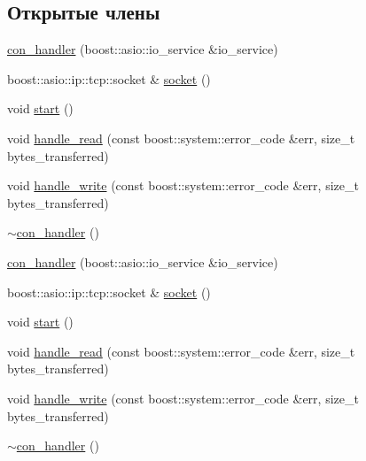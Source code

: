 \subsection*{Открытые члены}
\begin{DoxyCompactItemize}
\item 
\mbox{\hyperlink{classcon__handler_a18e7e450430ebe71687a0fd0c79507aa}{con\+\_\+handler}} (boost\+::asio\+::io\+\_\+service \&io\+\_\+service)
\item 
boost\+::asio\+::ip\+::tcp\+::socket \& \mbox{\hyperlink{classcon__handler_ad168c799678add9fb23f3379e1d42b22}{socket}} ()
\item 
void \mbox{\hyperlink{classcon__handler_a02d6691e226a75525a2ac83062b5c7f7}{start}} ()
\item 
void \mbox{\hyperlink{classcon__handler_a3b8e9edfc8fed79fcba0242a58b54bc2}{handle\+\_\+read}} (const boost\+::system\+::error\+\_\+code \&err, size\+\_\+t bytes\+\_\+transferred)
\item 
void \mbox{\hyperlink{classcon__handler_a10169d7b3588adb849d7e7c02c46375a}{handle\+\_\+write}} (const boost\+::system\+::error\+\_\+code \&err, size\+\_\+t bytes\+\_\+transferred)
\item 
\mbox{\hyperlink{classcon__handler_aa1bc82c764eb633355a52bd77689ed3f}{$\sim$con\+\_\+handler}} ()
\item 
\mbox{\hyperlink{classcon__handler_a18e7e450430ebe71687a0fd0c79507aa}{con\+\_\+handler}} (boost\+::asio\+::io\+\_\+service \&io\+\_\+service)
\item 
boost\+::asio\+::ip\+::tcp\+::socket \& \mbox{\hyperlink{classcon__handler_ad1cbd939db0c1c543425d7cd53702a06}{socket}} ()
\item 
void \mbox{\hyperlink{classcon__handler_a02d6691e226a75525a2ac83062b5c7f7}{start}} ()
\item 
void \mbox{\hyperlink{classcon__handler_a3b8e9edfc8fed79fcba0242a58b54bc2}{handle\+\_\+read}} (const boost\+::system\+::error\+\_\+code \&err, size\+\_\+t bytes\+\_\+transferred)
\item 
void \mbox{\hyperlink{classcon__handler_a10169d7b3588adb849d7e7c02c46375a}{handle\+\_\+write}} (const boost\+::system\+::error\+\_\+code \&err, size\+\_\+t bytes\+\_\+transferred)
\item 
\mbox{\hyperlink{classcon__handler_aa1bc82c764eb633355a52bd77689ed3f}{$\sim$con\+\_\+handler}} ()
\end{DoxyCompactItemize}

